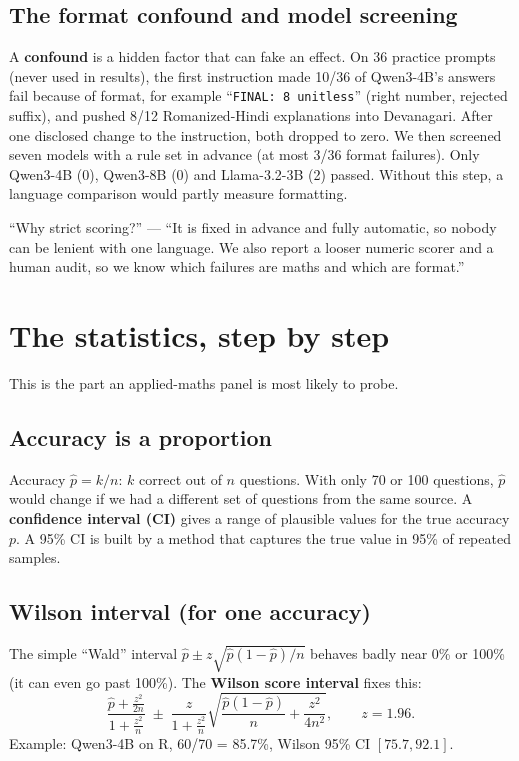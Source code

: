 \documentclass[11pt,a4paper]{article}
\begin{document}
\subsection{The format confound and model screening}
A \textbf{confound} is a hidden factor that can fake an effect. On 36 practice prompts (never used in results), the first instruction made 10/36 of Qwen3-4B's answers fail because of format, for example ``\texttt{FINAL: 8 unitless}'' (right number, rejected suffix), and pushed 8/12 Romanized-Hindi explanations into Devanagari. After one disclosed change to the instruction, both dropped to zero. We then screened seven models with a rule set in advance (at most 3/36 format failures). Only Qwen3-4B (0), Qwen3-8B (0) and Llama-3.2-3B (2) passed. Without this step, a language comparison would partly measure formatting.

\begin{ifasked}
``Why strict scoring?'' --- ``It is fixed in advance and fully automatic, so nobody can be lenient with one language. We also report a looser numeric scorer and a human audit, so we know which failures are maths and which are format.''
\end{ifasked}

\section{The statistics, step by step}

This is the part an applied-maths panel is most likely to probe.

\subsection{Accuracy is a proportion}
Accuracy $\hat p = k/n$: $k$ correct out of $n$ questions. With only 70 or 100 questions, $\hat p$ would change if we had a different set of questions from the same source. A \textbf{confidence interval (CI)} gives a range of plausible values for the true accuracy $p$. A 95\% CI is built by a method that captures the true value in 95\% of repeated samples.

\subsection{Wilson interval (for one accuracy)}
The simple ``Wald'' interval $\hat p \pm z\sqrt{\hat p(1-\hat p)/n}$ behaves badly near 0\% or 100\% (it can even go past 100\%). The \textbf{Wilson score interval} fixes this:
\[ \frac{\hat p + \frac{z^2}{2n}}{1+\frac{z^2}{n}} \;\pm\; \frac{z}{1+\frac{z^2}{n}}\sqrt{\frac{\hat p(1-\hat p)}{n} + \frac{z^2}{4n^2}}, \qquad z = 1.96. \]
Example: Qwen3-4B on R, 60/70 = 85.7\%, Wilson 95\% CI $[75.7, 92.1]$.
\end{document}
